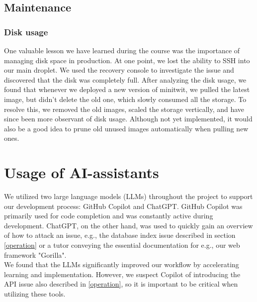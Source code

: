 \subsection{Maintenance}\label{maintainence}
\subsubsection{Disk usage}
One valuable lesson we have learned during the course was the importance of managing disk space in production. At one point, we lost the ability to SSH into our main droplet. We used the recovery console to investigate the issue and discovered that the disk was completely full. After analyzing the disk usage, we found that whenever we deployed a new version of minitwit, we pulled the latest image, but didn't delete the old one, which slowly consumed all the storage. To resolve this, we removed the old images, scaled the storage vertically, and have since been more observant of disk usage. Although not yet implemented, it would also be a good idea to prune old unused images automatically when pulling new ones.

\section{Usage of AI-assistants}
We utilized two large language models (LLMs) throughout the project to support our development process: GitHub Copilot and ChatGPT. GitHub Copilot was primarily used for code completion and was constantly active during development. ChatGPT, on the other hand, was used to quickly gain an overview of how to attack an issue, e.g., the database index issue described in section \ref{operation} or a tutor conveying the essential documentation for e.g., our web framework "Gorilla".
\\
We found that the LLMs significantly improved our workflow by accelerating learning and implementation. However, we suspect Copilot of introducing the API issue also described in \ref{operation}, so it is important to be critical when utilizing these tools.